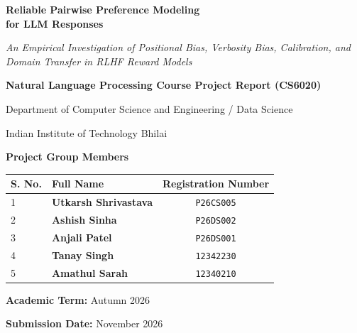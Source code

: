 \documentclass[12pt,a4paper]{article}
\begin{document}
\begin{titlepage}
    \centering
    \vspace*{0.5cm}
    
    {\Huge \bfseries Reliable Pairwise Preference Modeling\\[0.3cm] for LLM Responses \par}
    \vspace{0.4cm}
    {\LARGE \itshape An Empirical Investigation of Positional Bias, Verbosity Bias, Calibration, and Domain Transfer in RLHF Reward Models \par}
    
    \vspace{1.5cm}
    {\large \textbf{Natural Language Processing Course Project Report (CS6020)} \par}
    \vspace{0.2cm}
    {\large Department of Computer Science and Engineering / Data Science \par}
    {\large Indian Institute of Technology Bhilai \par}
    
    \vspace{1.5cm}
    \textbf{\Large Project Group Members}\\[0.4cm]
    \begin{table}[H]
        \centering
        \large
        \renewcommand{\arraystretch}{1.3}
        \begin{tabular}{llc}
            \toprule
            \textbf{S. No.} & \textbf{Full Name} & \textbf{Registration Number} \\
            \midrule
            1 & \textbf{Utkarsh Shrivastava} & \texttt{P26CS005} \\
            2 & \textbf{Ashish Sinha} & \texttt{P26DS002} \\
            3 & \textbf{Anjali Patel} & \texttt{P26DS001} \\
            4 & \textbf{Tanay Singh} & \texttt{12342230} \\
            5 & \textbf{Amathul Sarah} & \texttt{12340210} \\
            \bottomrule
        \end{tabular}
    \end{table}

    \vfill
    {\large \textbf{Academic Term:} Autumn 2026 \par}
    {\large \textbf{Submission Date:} November 2026 \par}
    \vspace*{0.5cm}
\end{titlepage}
\end{document}
